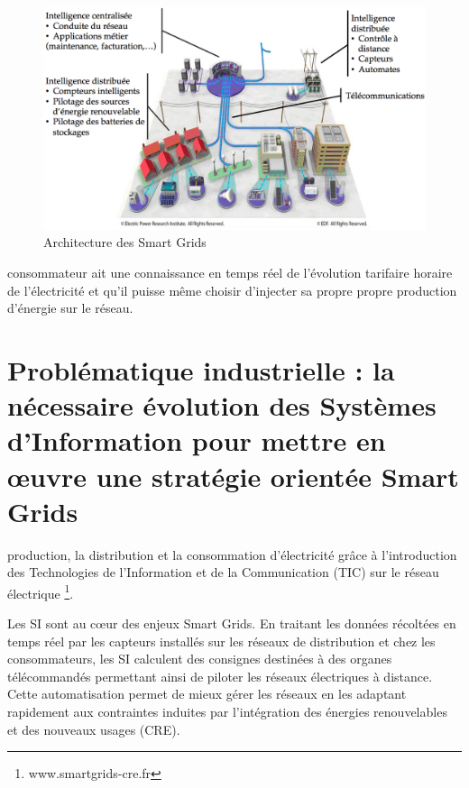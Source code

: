\begin{figure}[!htbp]
 \begin{center}
  \includegraphics[width=1\textwidth]{images/problematique/archiSmartgrids.png}
 \end{center}
 \caption{Architecture des Smart Grids \protect\cite{favre2006ingenierie}}
 \label{fig:archismartgrids}
\end{figure}


consommateur ait une connaissance en temps réel de l'évolution tarifaire horaire 
de l'électricité et qu'il puisse même choisir d'injecter sa propre propre 
production d'énergie sur le réseau.

\section{Problématique industrielle : la nécessaire évolution des Systèmes 
d'Information pour mettre en œuvre une stratégie orientée Smart Grids}

production, la distribution et la consommation d'électricité grâce à 
l'introduction des Technologies de l'Information et de la Communication (TIC) 
sur le réseau électrique \footnote{www.smartgrids-cre.fr}.

Les SI sont au cœur des enjeux Smart Grids. En traitant les données récoltées en 
temps réel par les capteurs installés sur les réseaux de distribution et chez 
les consommateurs, les SI calculent des consignes destinées à des organes 
télécommandés permettant ainsi de piloter les réseaux électriques à distance. 
Cette automatisation permet de mieux gérer les réseaux en les adaptant 
rapidement aux contraintes induites par l'intégration des énergies renouvelables 
et des nouveaux usages (CRE). 

